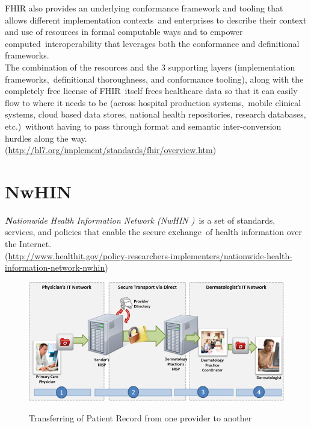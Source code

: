 \documentclass[DIV=calc, paper=a4, fontsize=12pt, onecolumn]{scrartcl}	 %
\newcommand{\initial}[1]{ %
\lettrine[lines=3,lhang=0.3,nindent=0em,slope=0em]{
\color{DarkBlue}
{\textbf{\textit{#1}}}}{}}
\begin{document}
  \noindent FHIR also provides an underlying conformance framework and tooling that allows different implementation contexts\ 
  and enterprises to describe their context and use of resources in formal computable ways and to empower computed\
  interoperability that leverages both the conformance and definitional frameworks.\\

  \noindent The combination of the resources and the 3 supporting layers (implementation frameworks,\
  definitional thoroughness, and conformance tooling), along with the completely free license of FHIR\
  itself frees healthcare data so that it can easily flow to where it needs to be (across hospital production systems,\
  mobile clinical systems, cloud based data stores, national health repositories, research databases, etc.)\
  without having to pass through format and semantic inter-conversion hurdles along the way.\\
  (\url{http://hl7.org/implement/standards/fhir/overview.htm})



  \section[Nationwide Health Information Network (NwHIN)]{NwHIN}
  \label{sec:nwhin}

  \initial{N}\textit{ationwide Health Information Network (NwHIN )}\
  is a set of standards, services, and policies that enable the secure exchange\
  of health information over the Internet.\\
  (\url{http://www.healthit.gov/policy-researchers-implementers/nationwide-health-information-network-nwhin})\\

  \begin{figure}[ht!]
    \centering
    \includegraphics[scale=0.5]{nwhin.png}
    \caption{Transferring of Patient Record from one provider to another}
    \cite[Fig.~1]{belleau_bio2rdf:_2008}
    \label{fig:nwhin}
  \end{figure}  
\end{document}
